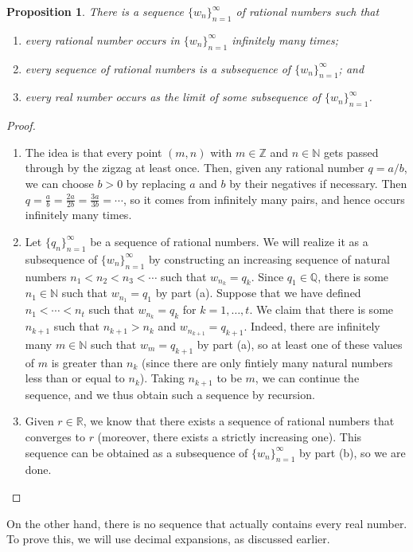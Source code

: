 \documentclass[12pt]{amsart}
\newcommand{\Q}{\mathbb{Q}}
\newcommand{\R}{{\mathbb{R}}}
\newcommand{\Z}{\mathbb{Z}}
\newcommand{\N}{\mathbb{N}}
\numberwithin{equation}{section}
\theoremstyle{plain} %
\newtheorem{prop}[equation]{Proposition}
\theoremstyle{definition}
\theoremstyle{remark}
\begin{document}
\begin{prop} There is a sequence $\{w_n\}_{n=1}^\infty$ of rational numbers such that
\begin{enumerate}
\item every rational number occurs in $\{w_n\}_{n=1}^\infty$ infinitely many times;
\item every sequence of rational numbers is a subsequence of $\{w_n\}_{n=1}^\infty$; and
\item every real number occurs as the limit of some subsequence of $\{w_n\}_{n=1}^\infty$.
\end{enumerate}
\end{prop}
\begin{proof}
\begin{enumerate}
\item The idea is that every point $(m,n)$ with $m\in \Z$ and $n\in \N$ gets passed through by the zigzag at least once. Then, given any rational number $q=a/b$, we can choose $b>0$ by replacing $a$ and $b$ by their negatives if necessary. Then $q= \frac{a}{b} = \frac{2a}{2b} = \frac{3a}{3b} = \cdots$, so it comes from infinitely many pairs, and hence occurs infinitely many times.
\item Let $\{q_n\}_{n=1}^\infty$ be a sequence of rational numbers. We will realize it as a subsequence of $\{w_n\}_{n=1}^\infty$ by constructing an increasing sequence of natural numbers $n_1<n_2<n_3<\cdots$ such that $w_{n_k} = q_k$. Since $q_1 \in \Q$, there is some $n_1\in \N$ such that $w_{n_1} = q_1$ by part (a). Suppose that we have defined $n_1<\cdots< n_t$ such that $w_{n_k} = q_k$ for $k=1,\dots,t$. We claim that there is some $n_{k+1}$ such that $n_{k+1} > n_k$ and $w_{n_{k+1}} = q_{k+1}$. Indeed, there are infinitely many $m\in\N$ such that $w_m = q_{k+1}$ by part (a), so at least one of these values of $m$ is greater than $n_k$ (since there are only fintiely many natural numbers less than or equal to $n_k$). Taking $n_{k+1}$ to be $m$, we can continue the sequence, and we thus obtain such a sequence by recursion.
\item Given $r\in \R$, we know that there exists a sequence of rational numbers that converges to $r$ (moreover, there exists a strictly increasing one). This sequence can be obtained as a subsequence of $\{w_n\}_{n=1}^\infty$ by part (b), so we are done.\qedhere
\end{enumerate}
\end{proof}

On the other hand, there is no sequence that actually contains every real number. To prove this, we will use decimal expansions, as discussed earlier.
\end{document}
